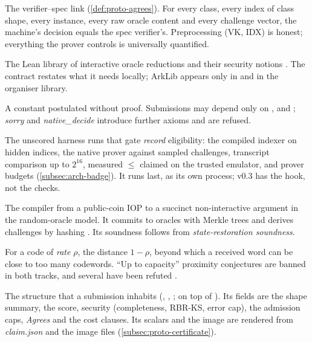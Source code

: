 \begin{description}[leftmargin=0pt,itemsep=2pt,parsep=0pt,font=\normalfont\bfseries]
\item[Agrees.] The verifier--spec link (\cref{def:proto-agrees}). For every class, every index of
  class shape, every instance, every raw oracle content and every challenge vector, the machine's
  decision equals the spec verifier's. Preprocessing (VK, IDX) is honest; everything the prover
  controls is universally quantified.

\item[ArkLib.] The Lean library of interactive oracle reductions and their security notions
  \cite{arklib2026}. The contract restates what it needs locally; ArkLib appears only in
   and in the organiser library.

\item[Axiom (Lean).] A constant postulated without proof. Submissions may depend only on
  ,  and ; \emph{sorry} and
  \emph{native\_decide} introduce further axioms and are refused.

\item[Badge path.] The unscored harness runs that gate \emph{record} eligibility: the compiled
  indexer on hidden indices, the native prover against sampled challenges, transcript comparison
  up to $2^{16}$, measured $\le$ claimed on the trusted emulator, and prover budgets
  (\cref{subsec:arch-badge}). It runs last, as its own process; v0.3 has the hook, not the checks.

\item[BCS transformation.] The compiler from a public-coin IOP to a succinct non-interactive
  argument in the random-oracle model. It commits to oracles with Merkle trees and derives
  challenges by hashing \cite{BCS16,CY24-Book}. Its soundness follows from \emph{state-restoration
  soundness}.

\item[Capacity.] For a code of \emph{rate} $\rho$, the distance $1-\rho$, beyond which a received
  word can be close to too many codewords. \enquote{Up to capacity} proximity conjectures are
  banned in both tracks, and several have been refuted \cite{CS25-PGC,BCHKS25}.

\item[Certificate.] The  structure that a submission inhabits (,
  , ;  on top of ). Its
  fields are the shape summary, the score, security (completeness, RBR-KS, error cap), the admission
  caps, \emph{Agrees} and the cost clauses. Its scalars and the image are rendered from
  \emph{claim.json} and the image files (\cref{subsec:proto-certificate}).


\end{description}
